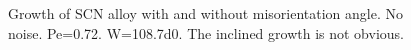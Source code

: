 \documentclass[a4paper,12pt]{article}
\begin{document}
\begin{figure}[!ht]
     \hfill
      \caption{Growth of SCN alloy with and without misorientation angle. No noise. Pe=0.72. W=108.7d0. The inclined growth is not obvious.}
     \label{fig:Ech}
   \end{figure}
\end{document}
